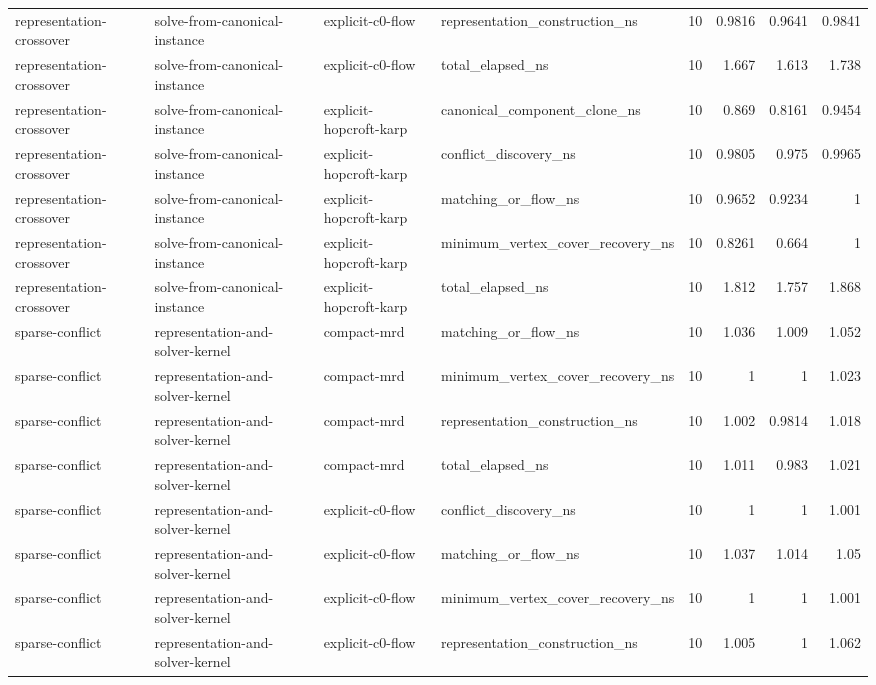 \begin{table}[t]
\begin{tabular}{llllrrrr}
representation-crossover & solve-from-canonical-instance & explicit-c0-flow & representation\_construction\_ns & 10 & 0.9816 & 0.9641 & 0.9841 \\
representation-crossover & solve-from-canonical-instance & explicit-c0-flow & total\_elapsed\_ns & 10 & 1.667 & 1.613 & 1.738 \\
representation-crossover & solve-from-canonical-instance & explicit-hopcroft-karp & canonical\_component\_clone\_ns & 10 & 0.869 & 0.8161 & 0.9454 \\
representation-crossover & solve-from-canonical-instance & explicit-hopcroft-karp & conflict\_discovery\_ns & 10 & 0.9805 & 0.975 & 0.9965 \\
representation-crossover & solve-from-canonical-instance & explicit-hopcroft-karp & matching\_or\_flow\_ns & 10 & 0.9652 & 0.9234 & 1 \\
representation-crossover & solve-from-canonical-instance & explicit-hopcroft-karp & minimum\_vertex\_cover\_recovery\_ns & 10 & 0.8261 & 0.664 & 1 \\
representation-crossover & solve-from-canonical-instance & explicit-hopcroft-karp & total\_elapsed\_ns & 10 & 1.812 & 1.757 & 1.868 \\
sparse-conflict & representation-and-solver-kernel & compact-mrd & matching\_or\_flow\_ns & 10 & 1.036 & 1.009 & 1.052 \\
sparse-conflict & representation-and-solver-kernel & compact-mrd & minimum\_vertex\_cover\_recovery\_ns & 10 & 1 & 1 & 1.023 \\
sparse-conflict & representation-and-solver-kernel & compact-mrd & representation\_construction\_ns & 10 & 1.002 & 0.9814 & 1.018 \\
sparse-conflict & representation-and-solver-kernel & compact-mrd & total\_elapsed\_ns & 10 & 1.011 & 0.983 & 1.021 \\
sparse-conflict & representation-and-solver-kernel & explicit-c0-flow & conflict\_discovery\_ns & 10 & 1 & 1 & 1.001 \\
sparse-conflict & representation-and-solver-kernel & explicit-c0-flow & matching\_or\_flow\_ns & 10 & 1.037 & 1.014 & 1.05 \\
sparse-conflict & representation-and-solver-kernel & explicit-c0-flow & minimum\_vertex\_cover\_recovery\_ns & 10 & 1 & 1 & 1.001 \\
sparse-conflict & representation-and-solver-kernel & explicit-c0-flow & representation\_construction\_ns & 10 & 1.005 & 1 & 1.062 \\

\end{tabular}
\end{table}
